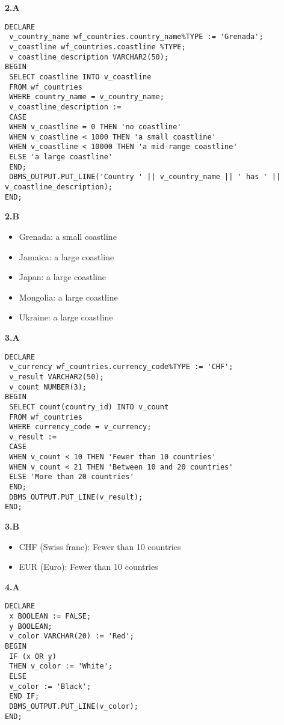 \documentclass[11pt]{article}
\begin{document}
\textbf{2.A}

\begin{verbatim}
DECLARE
 v_country_name wf_countries.country_name%TYPE := 'Grenada';
 v_coastline wf_countries.coastline %TYPE;
 v_coastline_description VARCHAR2(50);
BEGIN
 SELECT coastline INTO v_coastline
 FROM wf_countries
 WHERE country_name = v_country_name;
 v_coastline_description :=
 CASE
 WHEN v_coastline = 0 THEN 'no coastline'
 WHEN v_coastline < 1000 THEN 'a small coastline'
 WHEN v_coastline < 10000 THEN 'a mid-range coastline'
 ELSE 'a large coastline'
 END;
 DBMS_OUTPUT.PUT_LINE('Country ' || v_country_name || ' has ' || v_coastline_description);
END;
\end{verbatim}

\textbf{2.B}

\begin{itemize}
\item Grenada: a small coastline
\item Jamaica: a large coastline
\item Japan: a large coastline
\item Mongolia: a large coastline
\item Ukraine: a large coastline
\end{itemize}

\textbf{3.A}

\begin{verbatim}
DECLARE
 v_currency wf_countries.currency_code%TYPE := 'CHF';
 v_result VARCHAR2(50);
 v_count NUMBER(3);
BEGIN
 SELECT count(country_id) INTO v_count
 FROM wf_countries
 WHERE currency_code = v_currency;
 v_result :=
 CASE
 WHEN v_count < 10 THEN 'Fewer than 10 countries'
 WHEN v_count < 21 THEN 'Between 10 and 20 countries'
 ELSE 'More than 20 countries'
 END;
 DBMS_OUTPUT.PUT_LINE(v_result);
END;
\end{verbatim}

\textbf{3.B}

\begin{itemize}
\item CHF (Swiss franc): Fewer than 10 countries
\item EUR (Euro): Fewer than 10 countries
\end{itemize}

\textbf{4.A}

\begin{verbatim}
DECLARE
 x BOOLEAN := FALSE;
 y BOOLEAN;
 v_color VARCHAR(20) := 'Red';
BEGIN
 IF (x OR y)
 THEN v_color := 'White';
 ELSE
 v_color := 'Black';
 END IF;
 DBMS_OUTPUT.PUT_LINE(v_color);
END;
\end{verbatim}
\end{document}
